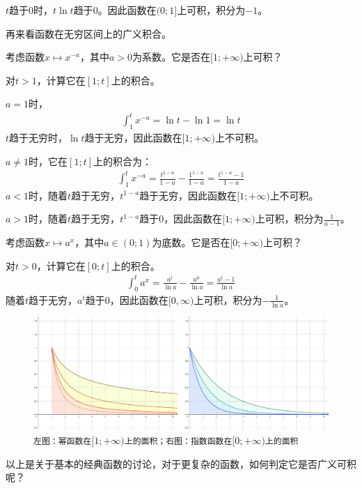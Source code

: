 \documentclass[12pt,UTF8]{ctexbook}
\theoremstyle{definition}
\theoremstyle{plain}
\begin{document}
$t$趋于$0$时，$t\ln{t}$趋于$0$。因此函数在$(0;1]$上可积，积分为$-1$。

再来看函数在无穷区间上的广义积合。

考虑函数$x\mapsto x^{-a}$，其中$a>0$为系数。它是否在$[1;+\infty)$上可积？

对$t>1$，计算它在$[1;t]$上的积合。

$a=1$时，
\begin{align*}
    \int_1^t x^{-a} = \ln{t} - \ln{1} = \ln{t} 
\end{align*}
$t$趋于无穷时，$\ln{t}$趋于无穷，因此函数在$[1;+\infty)$上不可积。

$a\neq 1$时，它在$[1;t]$上的积合为：
\begin{align*}
    \int_1^t x^{-a} = \frac{t^{1-a}}{1 - a} - \frac{1^{1-a}}{1 - a} = \frac{t^{1-a} - 1}{1-a} 
\end{align*}
$a<1$时，随着$t$趋于无穷，$t^{1-a}$趋于无穷，因此函数在$[1;+\infty)$上不可积。

$a>1$时，随着$t$趋于无穷，$t^{1-a}$趋于$0$，因此函数在$[1;+\infty)$上可积，积分为$\frac{1}{a-1}$。

考虑函数$x\mapsto a^x$，其中$a\in(0;1)$为底数。它是否在$[0;+\infty)$上可积？

对$t>0$，计算它在$[0;t]$上的积合。
\begin{align*}
    \int_0^t a^x = \frac{a^t}{\ln{a}} - \frac{a^0}{\ln{a}} = \frac{a^t - 1}{\ln{a}}
\end{align*}
随着$t$趋于无穷，$a^t$趋于$0$，因此函数在$[0,\infty)$上可积，积分为$-\frac{1}{\ln{a}}$。

\begin{figure}[h] %
    \vspace{4pt}
    \centering
    \includegraphics[width=\textwidth]{tu/广义积分2.png}
    \caption*{\texttt{左图：幂函数在}$[1;+\infty)$\texttt{上的面积；右图：指数函数在}$[0;+\infty)$\texttt{上的面积}}
\end{figure}

以上是关于基本的经典函数的讨论，对于更复杂的函数，如何判定它是否广义可积呢？
\end{document}
